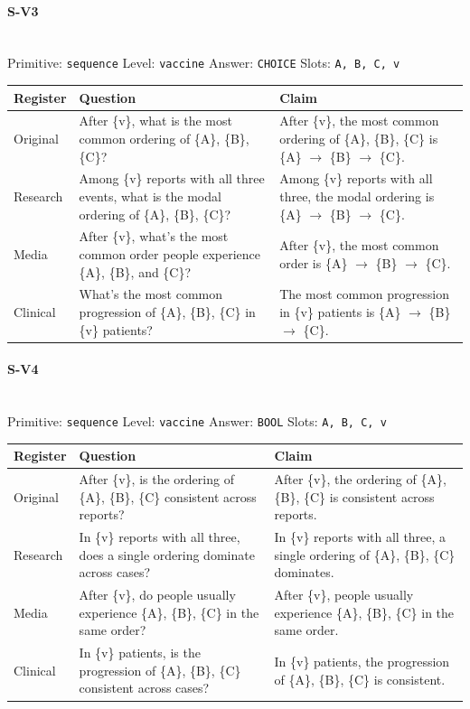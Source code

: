 \documentclass[11pt]{article}
\begin{document}
\paragraph{\textbf{S-V3}}\mbox{}\\
Primitive: \texttt{sequence} \quad Level: \texttt{vaccine} \quad Answer: \texttt{CHOICE} \quad Slots: \texttt{A, B, C, v}\\[2pt]
\begin{tabularx}{\linewidth}{@{}l L L@{}}
\toprule
\textbf{Register} & \textbf{Question} & \textbf{Claim} \\
\midrule
Original & After \{v\}, what is the most common ordering of \{A\}, \{B\}, \{C\}? & After \{v\}, the most common ordering of \{A\}, \{B\}, \{C\} is \{A\} $\rightarrow$  \{B\} $\rightarrow$  \{C\}. \\
Research & Among \{v\} reports with all three events, what is the modal ordering of \{A\}, \{B\}, \{C\}? & Among \{v\} reports with all three, the modal ordering is \{A\} $\rightarrow$  \{B\} $\rightarrow$  \{C\}. \\
Media & After \{v\}, what's the most common order people experience \{A\}, \{B\}, and \{C\}? & After \{v\}, the most common order is \{A\} $\rightarrow$  \{B\} $\rightarrow$  \{C\}. \\
Clinical & What's the most common progression of \{A\}, \{B\}, \{C\} in \{v\} patients? & The most common progression in \{v\} patients is \{A\} $\rightarrow$  \{B\} $\rightarrow$  \{C\}. \\
\bottomrule
\end{tabularx}
\vspace{4pt}

\paragraph{\textbf{S-V4}}\mbox{}\\
Primitive: \texttt{sequence} \quad Level: \texttt{vaccine} \quad Answer: \texttt{BOOL} \quad Slots: \texttt{A, B, C, v}\\[2pt]
\begin{tabularx}{\linewidth}{@{}l L L@{}}
\toprule
\textbf{Register} & \textbf{Question} & \textbf{Claim} \\
\midrule
Original & After \{v\}, is the ordering of \{A\}, \{B\}, \{C\} consistent across reports? & After \{v\}, the ordering of \{A\}, \{B\}, \{C\} is consistent across reports. \\
Research & In \{v\} reports with all three, does a single ordering dominate across cases? & In \{v\} reports with all three, a single ordering of \{A\}, \{B\}, \{C\} dominates. \\
Media & After \{v\}, do people usually experience \{A\}, \{B\}, \{C\} in the same order? & After \{v\}, people usually experience \{A\}, \{B\}, \{C\} in the same order. \\
Clinical & In \{v\} patients, is the progression of \{A\}, \{B\}, \{C\} consistent across cases? & In \{v\} patients, the progression of \{A\}, \{B\}, \{C\} is consistent. \\
\bottomrule
\end{tabularx}
\vspace{4pt}
\end{document}
